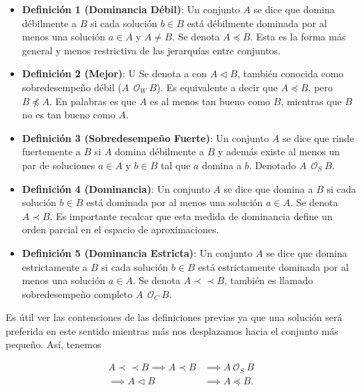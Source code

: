 \begin{itemize}
    \item \textbf{Definición 1 (Dominancia Débil)}: Un conjunto \( A \) se dice que domina débilmente a \( B \) si cada solución \( b \in B \) está débilmente dominada por al menos una solución \( a \in A \) y $A\neq B$. Se denota $ A \preceq B$.  Esta es la forma más general y menos restrictiva de las jerarquías entre conjuntos.
    \item \textbf{Definición 2 (Mejor)}: U Se denota a con $ A \vartriangleleft   B$, también conocida como sobredesempeño débil ($A \ \ \mathcal{O}_W \ B$). Es equivalente a decir que $A \preceq B$, pero $B \npreceq A$. En palabras es que $A$ es al menos tan bueno como $B$, mientras que $B$ no es tan bueno como $A$. 
    
    \item \textbf{Definición 3 (Sobredesempeño Fuerte)}: Un conjunto \( A \) se dice que rinde fuertemente a \( B \) si \( A \) domina débilmente a \( B \) y además existe al menos un par de soluciones \( a \in A \) y \( b \in B \) tal que \( a \) domina a \( b \). Denotado $A \ \ \mathcal{O}_S \ B$.
    \item \textbf{Definición 4 (Dominancia)}: Un conjunto \( A \) se dice que domina a \( B \) si cada solución \( b \in B \) está dominada por al menos una solución \( a \in A \). Se denota $A \prec B$. Es importante recalcar que esta medida de dominancia define un orden parcial en el espacio de aproximaciones.
    \item \textbf{Definición 5 (Dominancia Estricta)}: Un conjunto \( A \) se dice que domina estrictamente a \( B \) si cada solución \( b \in B \) está estrictamente dominada por al menos una solución \( a \in A \). Se denota $ A \prec \prec B$, también es llamado sobredesempeño completo $A \ \ \mathcal{O}_C \ B$.
\end{itemize}



Es útil ver las contenciones de las definiciones previas ya que una solución será preferida en este sentido mientras más nos desplazamos hacia el conjunto más pequeño. Así, tenemos 

\begin{align} \label{eq:contencion_comp_sets}
    A \prec \prec B \implies A \prec B &\implies A \ \mathcal{O}_S \ B  \nonumber\\
    \implies A \vartriangleleft B &\implies A\preceq B. \nonumber
\end{align}


